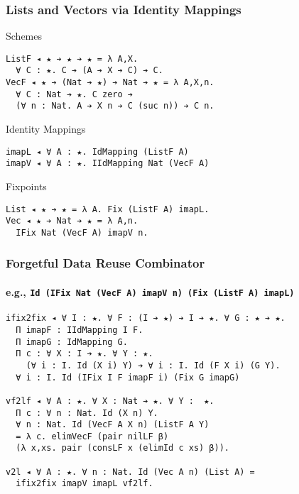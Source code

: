 \documentclass[mathserif,usenames,dvipsnames]{beamer}
\begin{document}
\begin{frame}[fragile]
\frametitle{Lists and Vectors via Identity Mappings}

\begin{block}{Schemes}
\begin{verbatim}
ListF ◂ ★ ➔ ★ ➔ ★ = λ A,X. 
  ∀ C : ★. C ➔ (A ➔ X ➔ C) ➔ C.
VecF ◂ ★ ➔ (Nat ➔ ★) ➔ Nat ➔ ★ = λ A,X,n. 
  ∀ C : Nat ➔ ★. C zero ➔ 
  (∀ n : Nat. A ➔ X n ➔ C (suc n)) ➔ C n.
\end{verbatim}
\end{block}

\begin{block}{Identity Mappings}
\begin{verbatim}
imapL ◂ ∀ A : ★. IdMapping (ListF A)
imapV ◂ ∀ A : ★. IIdMapping Nat (VecF A)
\end{verbatim}
\end{block}


\begin{block}{Fixpoints}
\begin{verbatim}
List ◂ ★ ➔ ★ = λ A. Fix (ListF A) imapL.
Vec ◂ ★ ➔ Nat ➔ ★ = λ A,n. 
  IFix Nat (VecF A) imapV n.
\end{verbatim}
\end{block}

\end{frame}


\begin{frame}[fragile]
\frametitle{Forgetful Data Reuse Combinator}
\framesubtitle{e.g., \texttt{Id (IFix Nat (VecF A) imapV n) (Fix (ListF A) imapL)}}
  
\begin{verbatim}
ifix2fix ◂ ∀ I : ★. ∀ F : (I ➔ ★) ➔ I ➔ ★. ∀ G : ★ ➔ ★. 
  Π imapF : IIdMapping I F. 
  Π imapG : IdMapping G.
  Π c : ∀ X : I ➔ ★. ∀ Y : ★. 
    (∀ i : I. Id (X i) Y) ➔ ∀ i : I. Id (F X i) (G Y).
  ∀ i : I. Id (IFix I F imapF i) (Fix G imapG)

vf2lf ◂ ∀ A : ★. ∀ X : Nat ➔ ★. ∀ Y :  ★. 
  Π c : ∀ n : Nat. Id (X n) Y.
  ∀ n : Nat. Id (VecF A X n) (ListF A Y)
  = λ c. elimVecF (pair nilLF β)
  (λ x,xs. pair (consLF x (elimId c xs) β)).

v2l ◂ ∀ A : ★. ∀ n : Nat. Id (Vec A n) (List A) =
  ifix2fix imapV imapL vf2lf. 
\end{verbatim}

\end{frame}
\end{document}
